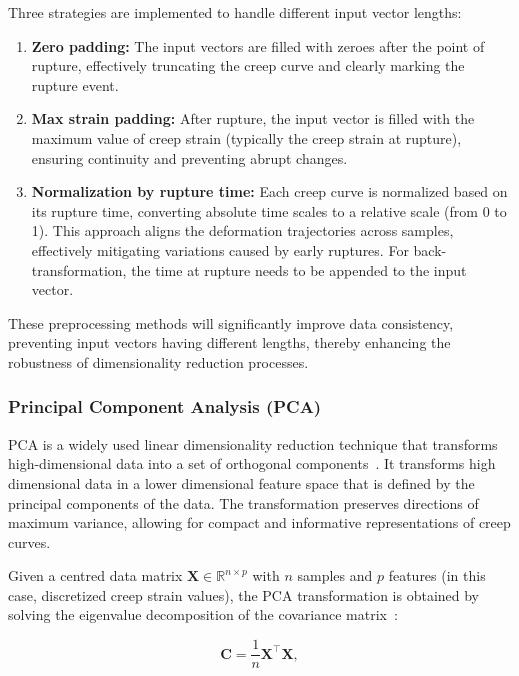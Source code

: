 \documentclass[class=scrbook, crop=false]{standalone}
\begin{document}
	Three strategies are implemented to handle different input vector lengths:
	
	\begin{enumerate}
		\item \textbf{Zero padding:} The input vectors are filled with zeroes after the point of rupture, effectively truncating the creep curve and clearly marking the rupture event.
		
		\item \textbf{Max strain padding:} After rupture, the input vector is filled with the maximum value of creep strain (typically the creep strain at rupture), ensuring continuity and preventing abrupt changes.
		
		\item \textbf{Normalization by rupture time:} Each creep curve is normalized based on its rupture time, converting absolute time scales to a relative scale (from 0 to 1). This approach aligns the deformation trajectories across samples, effectively mitigating variations caused by early ruptures. For back-transformation, the time at rupture needs to be appended to the input vector.
		
	\end{enumerate}
	
	These preprocessing methods will significantly improve data consistency, preventing input vectors having different lengths, thereby enhancing the robustness of dimensionality reduction processes. 
	
	\subsubsection{Principal Component Analysis (PCA)}
	
	PCA is a widely used linear dimensionality reduction technique that transforms high-dimensional data into a set of orthogonal components~\cite{bishop2006pattern}. It transforms high dimensional data in a lower dimensional feature space that is defined by the principal components of the data. The transformation preserves directions of maximum variance, allowing for compact and informative representations of creep curves.		
	
	Given a centred data matrix $\mathbf{X} \in \mathbb{R}^{n \times p}$ with $n$ samples and $p$ features (in this case, discretized creep strain values), the PCA transformation is obtained by solving the eigenvalue decomposition of the covariance matrix~\cite{jolliffe2002principal}:
	
	\begin{equation}
		\mathbf{C} = \frac{1}{n} \mathbf{X}^\top \mathbf{X},
	\end{equation}
	
\end{document}
